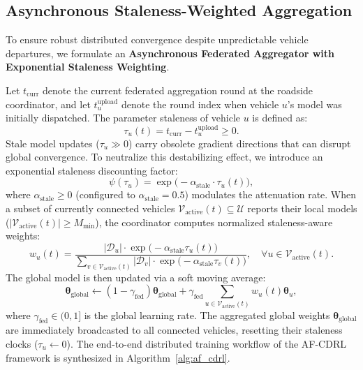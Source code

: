 \documentclass[12pt,a4paper]{article}
\begin{document}
\subsection{Asynchronous Staleness-Weighted Aggregation}
\label{subsec:async_staleness}
To ensure robust distributed convergence despite unpredictable vehicle departures, we formulate an \textbf{Asynchronous Federated Aggregator with Exponential Staleness Weighting}.

Let $t_{\mathrm{curr}}$ denote the current federated aggregation round at the roadside coordinator, and let $t_u^{\mathrm{upload}}$ denote the round index when vehicle $u$'s model was initially dispatched. The parameter staleness of vehicle $u$ is defined as:
\begin{equation}
\tau_u(t) = t_{\mathrm{curr}} - t_u^{\mathrm{upload}} \ge 0.
\label{eq:staleness_def}
\end{equation}
Stale model updates ($\tau_u \gg 0$) carry obsolete gradient directions that can disrupt global convergence. To neutralize this destabilizing effect, we introduce an exponential staleness discounting factor:
\begin{equation}
\psi(\tau_u) = \exp\big( -\alpha_{\mathrm{stale}} \cdot \tau_u(t) \big),
\label{eq:staleness_discount}
\end{equation}
where $\alpha_{\mathrm{stale}} \ge 0$ (configured to $\alpha_{\mathrm{stale}} = 0.5$) modulates the attenuation rate. When a subset of currently connected vehicles $\mathcal{V}_{\mathrm{active}}(t) \subseteq \mathcal{U}$ reports their local models ($|\mathcal{V}_{\mathrm{active}}(t)| \ge M_{\min}$), the coordinator computes normalized staleness-aware weights:
\begin{equation}
w_u(t) = \frac{|\mathcal{D}_u| \cdot \exp\big(-\alpha_{\mathrm{stale}} \tau_u(t)\big)}{\sum_{v \in \mathcal{V}_{\mathrm{active}}(t)} |\mathcal{D}_v| \cdot \exp\big(-\alpha_{\mathrm{stale}} \tau_v(t)\big)}, \quad \forall u \in \mathcal{V}_{\mathrm{active}}(t).
\label{eq:async_weights}
\end{equation}
The global model is then updated via a soft moving average:
\begin{equation}
\boldsymbol{\theta}_{\mathrm{global}} \leftarrow (1 - \gamma_{\mathrm{fed}}) \boldsymbol{\theta}_{\mathrm{global}} + \gamma_{\mathrm{fed}} \sum_{u \in \mathcal{V}_{\mathrm{active}}(t)} w_u(t) \boldsymbol{\theta}_u,
\label{eq:async_global_update}
\end{equation}
where $\gamma_{\mathrm{fed}} \in (0, 1]$ is the global learning rate. The aggregated global weights $\boldsymbol{\theta}_{\mathrm{global}}$ are immediately broadcasted to all connected vehicles, resetting their staleness clocks ($\tau_u \leftarrow 0$). The end-to-end distributed training workflow of the AF-CDRL framework is synthesized in Algorithm~\ref{alg:af_cdrl}.
\end{document}
